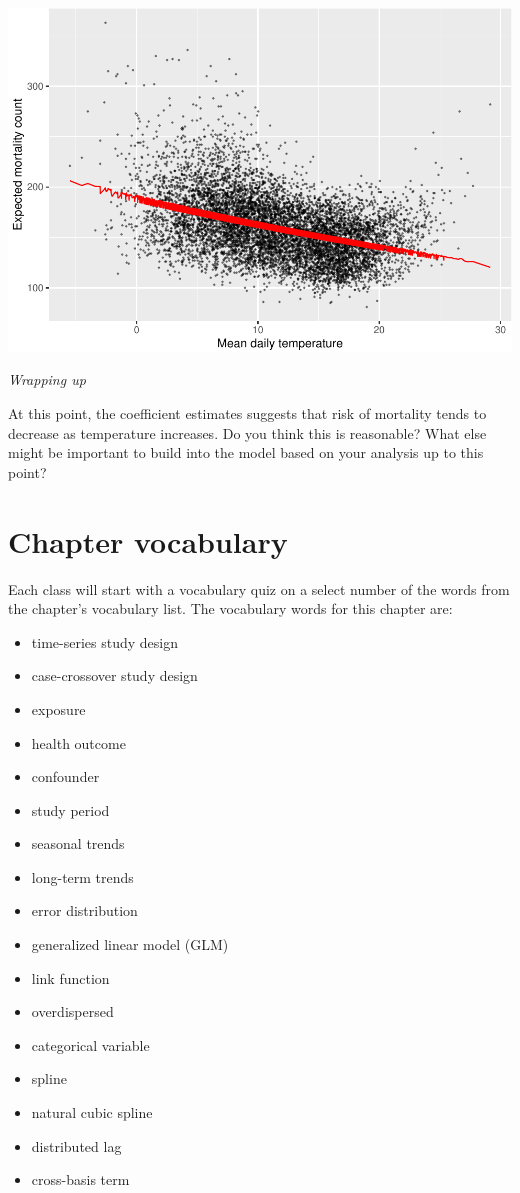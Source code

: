 \documentclass[
]{book}
\providecommand{\tightlist}{%
  \setlength{\itemsep}{0pt}\setlength{\parskip}{0pt}}
\begin{document}
\includegraphics{adv_epi_analysis_files/figure-latex/unnamed-chunk-38-1.pdf}

\emph{Wrapping up}

At this point, the coefficient estimates suggests that risk of mortality
tends to decrease as temperature increases. Do you think this is reasonable?
What else might be important to build into the model based on your analysis
up to this point?

\hypertarget{chapter-vocabulary}{%
\section{Chapter vocabulary}\label{chapter-vocabulary}}

Each class will start with a vocabulary quiz on a select number of the words
from the chapter's vocabulary list. The vocabulary words for this chapter are:

\begin{itemize}
\tightlist
\item
  time-series study design
\item
  case-crossover study design
\item
  exposure
\item
  health outcome
\item
  confounder
\item
  study period
\item
  seasonal trends
\item
  long-term trends
\item
  error distribution
\item
  generalized linear model (GLM)
\item
  link function
\item
  overdispersed
\item
  categorical variable
\item
  spline
\item
  natural cubic spline
\item
  distributed lag
\item
  cross-basis term
\end{itemize}
\end{document}
